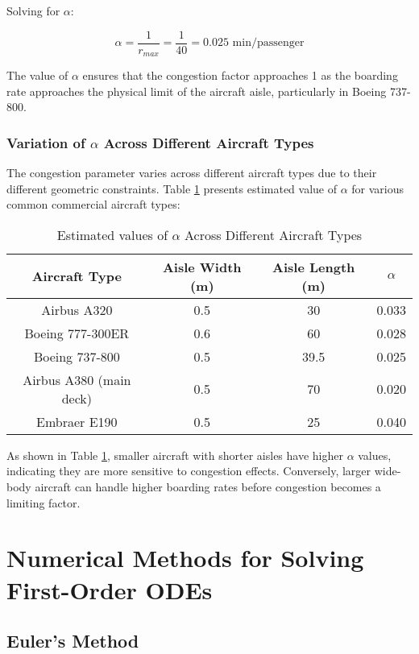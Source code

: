 \documentclass[12pt]{article}
\begin{document}
Solving for $\alpha$:

\begin{equation}
\alpha = \frac{1}{r_{max}} = \frac{1}{40} = 0.025 \text{ min/passenger}
\end{equation}

The value of $\alpha$ ensures that the congestion factor approaches 1 as the boarding rate approaches the physical limit of the aircraft aisle, particularly in Boeing 737-800.

\subsubsection{Variation of $\alpha$ Across Different Aircraft Types}

The congestion parameter varies across different aircraft types due to their different geometric constraints. Table \ref{tab:alpha-values} presents estimated value of $\alpha$ for various common commercial aircraft types:

\begin{table}[H]
\centering
\caption{Estimated values of $\alpha$ Across Different Aircraft Types}
\label{tab:alpha-values}
\begin{tabular}{cccc}
\toprule
\textbf{Aircraft Type} & \textbf{Aisle Width (m)} & \textbf{Aisle Length (m)} & \textbf{$\alpha$} \\
\midrule
Airbus A320 & 0.5 & 30 & 0.033 \\
Boeing 777-300ER & 0.6 & 60 & 0.028 \\
Boeing 737-800 & 0.5 & 39.5 & 0.025 \\
Airbus A380 (main deck) & 0.5 & 70 & 0.020 \\
Embraer E190 & 0.5 & 25 & 0.040 \\
\bottomrule
\end{tabular}
\end{table}

As shown in Table \ref{tab:alpha-values}, smaller aircraft with shorter aisles have higher $\alpha$ values, indicating they are more sensitive to congestion effects. Conversely, larger wide-body aircraft can handle higher boarding rates before congestion becomes a limiting factor.

\section{Numerical Methods for Solving First-Order ODEs}
\subsection{Euler's Method}
\end{document}
